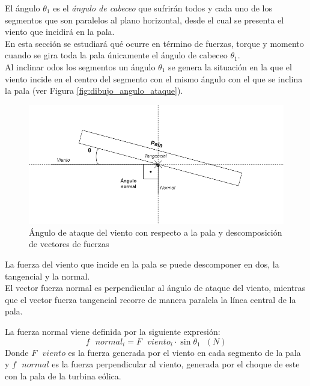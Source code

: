 El ángulo $ \theta_1 $ es el \textit{ángulo de cabeceo} que sufrirán todos y cada uno de los segmentos que son paralelos al plano horizontal, desde el cual se presenta el viento que incidirá en la pala.\\


En esta sección se estudiará qué ocurre en término de fuerzas, torque y momento cuando se gira toda la pala únicamente el ángulo de cabeceo $ \theta_1 $. \\


Al inclinar odos los segmentos un ángulo $ \theta_1 $ se genera la situación en la que el viento incide en el centro del segmento con el mismo ángulo con el que se inclina la pala (ver Figura \ref{fig:dibujo_angulo_ataque}). \\

\begin{figure}[H]
    \centering
    \includegraphics[width=1\textwidth]{images/dibujo fuerzas.drawio.png}
    \caption{Ángulo de ataque del viento con respecto a la pala y descomposición de vectores de fuerzas}
    
    \label{fig:dibujo_fuerzas}
\end{figure}

La fuerza del viento que incide en la pala se puede descomponer en dos, la tangencial y la normal. \\

El vector fuerza normal es perpendicular al ángulo de ataque del viento, mientras que el vector fuerza tangencial recorre de manera paralela la línea central de la pala.

 La fuerza normal viene definida por la siguiente expresión:
 \begin{equation}
   f \text{ } normal_i = F \text{ } viento_i \cdot \sin{\theta_1} \hspace{7pt} (N)
 \label{def:fuerza_normal}
 \end{equation}
 Donde $F \text{ } viento$ es la fuerza generada por el viento en cada segmento de la pala y $f \text{ } normal$ es la fuerza perpendicular al viento, generada por el choque de este con la pala de la turbina eólica.\\


